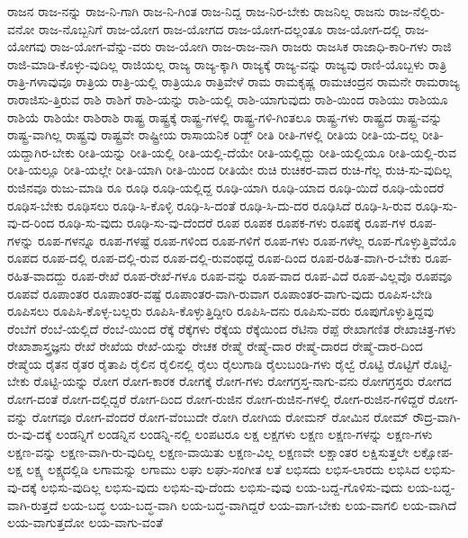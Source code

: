 {ರಾಜನ
ರಾಜ-ನನ್ನು
ರಾಜ-ನಿ-ಗಾಗಿ
ರಾಜ-ನಿ-ಗಿಂತ
ರಾಜ-ನಿದ್ದ
ರಾಜ-ನಿರ-ಬೇಕು
ರಾಜನಿಲ್ಲ
ರಾಜನು
ರಾಜ-ನೆಲ್ಲಿರು-ವನೋ
ರಾಜ-ನೊಬ್ಬನಿಗೆ
ರಾಜ-ಯೋಗ
ರಾಜ-ಯೋಗದ
ರಾಜ-ಯೋಗ-ದಲ್ಲಂತೂ
ರಾಜ-ಯೋಗ-ದಲ್ಲಿ
ರಾಜ-ಯೋಗವು
ರಾಜ-ಯೋಗ-ವೆನ್ನು-ವರು
ರಾಜ-ಯೋಗಿ
ರಾಜ-ರಾಜ-ನಾಗಿ
ರಾಜರು
ರಾಜಸಿಕ
ರಾಜಾಧಿ-ಕಾರಿ-ಗಳು
ರಾಜಿ
ರಾಜಿ-ಮಾಡಿ-ಕೊಳ್ಳು-ವುದಿಲ್ಲ
ರಾಜಿಯಲ್ಲ
ರಾಜ್ಯ
ರಾಜ್ಯ-ಕ್ಕಾಗಿ
ರಾಜ್ಯಕ್ಕೆ
ರಾಜ್ಯ-ವನ್ನು
ರಾಜ್ಯವು
ರಾಣಿ-ಯೊಬ್ಬಳು
ರಾತ್ರಿ
ರಾತ್ರಿ-ಗಳಾವುವೂ
ರಾತ್ರಿಯ
ರಾತ್ರಿ-ಯಲ್ಲಿ
ರಾತ್ರಿಯೂ
ರಾತ್ರಿವೇಳೆ
ರಾಮ
ರಾಮಕೃಷ್ಣ
ರಾಮಚಂದ್ರನ
ರಾಮನೇ
ರಾಮರಾಜ್ಯ
ರಾರಾಜಿಸು-ತ್ತಿರುವ
ರಾಶಿ
ರಾಶಿಗೆ
ರಾಶಿ-ಯನ್ನು
ರಾಶಿ-ಯಲ್ಲಿ
ರಾಶಿ-ಯಾಗುವುದು
ರಾಶಿ-ಯಿಂದ
ರಾಶಿಯು
ರಾಶಿಯೂ
ರಾಶಿಯೆ
ರಾಶಿಯೇ
ರಾಶಿರಾಶಿ
ರಾಷ್ಟ್ರ
ರಾಷ್ಟ್ರಕ್ಕೆ
ರಾಷ್ಟ್ರ-ಗಳಲ್ಲಿ
ರಾಷ್ಟ್ರ-ಗಳಿ-ಗಿಂತಲೂ
ರಾಷ್ಟ್ರ-ಗಳು
ರಾಷ್ಟ್ರದ
ರಾಷ್ಟ್ರ-ವನ್ನು
ರಾಷ್ಟ್ರ-ವಾಗಿಲ್ಲ
ರಾಷ್ಟ್ರವು
ರಾಷ್ಟ್ರವೇ
ರಾಷ್ಟ್ರೀಯ
ರಾಸಾಯನಿಕ
ರಿಡ್ಜ್
ರೀತಿ
ರೀತಿ-ಗಳಲ್ಲಿ
ರೀತಿಯ
ರೀತಿ-ಯ-ದಲ್ಲ
ರೀತಿ-ಯದ್ದಾಗಿರ-ಬೇಕು
ರೀತಿ-ಯನ್ನು
ರೀತಿ-ಯಲ್ಲಿ
ರೀತಿ-ಯಲ್ಲಿ-ದೆಯೇ
ರೀತಿ-ಯಲ್ಲಿದ್ದು
ರೀತಿ-ಯಲ್ಲಿಯೂ
ರೀತಿ-ಯಲ್ಲಿ-ರುವ
ರೀತಿ-ಯಲ್ಲೂ
ರೀತಿ-ಯಲ್ಲೇ
ರೀತಿ-ಯಾಗಿ
ರೀತಿ-ಯಿಂದ
ರೀತಿಯೇ
ರುಚಿ
ರುಚಿಕರ-ವಾದ
ರುಚಿ-ಗೆಲ್ಲ
ರುಚಿ-ಸು-ವುದಿಲ್ಲ
ರುಜಿನವೂ
ರುಜು-ಮಾಡಿ
ರೂ
ರೂಢಿ
ರೂಢಿ-ಯಲ್ಲಿದ್ದ
ರೂಢಿ-ಯಾಗಿ
ರೂಢಿ-ಯಾದ
ರೂಢಿ-ಯಿದೆ
ರೂಢಿ-ಯೆಂದರೆ
ರೂಢಿಸ-ಬೇಕು
ರೂಢಿಸಲು
ರೂಢಿ-ಸಿ-ಕೊಳ್ಳಿ
ರೂಢಿ-ಸಿ-ದಂತೆ
ರೂಢಿ-ಸಿ-ದು-ದರ
ರೂಢಿಸಿದೆ
ರೂಢಿ-ಸಿ-ರುವ
ರೂಢಿ-ಸು-ವು-ದ-ರಿಂದ
ರೂಢಿ-ಸು-ವುದು
ರೂಢಿ-ಸು-ವು-ದೆಂದರೆ
ರೂಪ
ರೂಪಕ
ರೂಪಕ-ಗಳು
ರೂಪಕ್ಕೆ
ರೂಪ-ಗಳ
ರೂಪ-ಗಳನ್ನು
ರೂಪ-ಗಳನ್ನೂ
ರೂಪ-ಗಳಷ್ಟೆ
ರೂಪ-ಗಳಿಂದ
ರೂಪ-ಗಳಿಗೆ
ರೂಪ-ಗಳು
ರೂಪ-ಗಳೆಲ್ಲ
ರೂಪ-ಗೊಳ್ಳುತ್ತಿವೆಯೊ
ರೂಪದ
ರೂಪ-ದಲ್ಲಿ
ರೂಪ-ದಲ್ಲಿ-ರುವ
ರೂಪ-ದಲ್ಲಿ-ರುವಂಥದ್ದೆ
ರೂಪ-ದಿಂದ
ರೂಪ-ರಹಿತ-ವಾಗಿ-ರ-ಬೇಕು
ರೂಪ-ರಹಿತ-ವಾದದ್ದು
ರೂಪ-ರೇಖೆ
ರೂಪ-ರೇಖೆ-ಗಳೂ
ರೂಪ-ವನ್ನು
ರೂಪ-ವಾದ
ರೂಪ-ವಿದೆ
ರೂಪ-ವಿಲ್ಲವೊ
ರೂಪವೂ
ರೂಪವೆ
ರೂಪಾಂತರ
ರೂಪಾಂತರ-ವಷ್ಟೆ
ರೂಪಾಂತರ-ವಾಗಿ-ರುವಾಗ
ರೂಪಾಂತರ-ವಾಗು-ವುದು
ರೂಪಿಸ-ಬೇಡಿ
ರೂಪಿಸಲು
ರೂಪಿಸಿ-ಕೊಳ್ಳ-ಬಲ್ಲರು
ರೂಪಿಸಿ-ಕೊಳ್ಳುತ್ತಿದ್ದೀರಿ
ರೂಪಿಸಿ-ದನು
ರೂಪಿಸು-ವರು
ರೂಪುಗೊಳ್ಳುತ್ತಿದ್ದವು
ರೆಂಬೆಗೆ
ರೆಂಬೆ-ಯಲ್ಲಿದೆ
ರೆಂಬೆ-ಯಿಂದ
ರೆಕ್ಕೆ
ರೆಕ್ಕೆಗಳು
ರೆಕ್ಕೆಯ
ರೆಕ್ಕೆಯಿಂದ
ರೆಟಿನಾ
ರೆಪ್ಪೆ
ರೇಖಾಗಣಿತ
ರೇಖಾಚಿತ್ರ-ಗಳು
ರೇಖಾಶಾಸ್ತ್ರಜ್ಞನು
ರೇಖೆ
ರೇಖೆಯ
ರೇಖೆ-ಯನ್ನು
ರೇಚಕ
ರೇಷ್ಮೆ
ರೇಷ್ಮೆ-ದಾರ
ರೇಷ್ಮೆ-ದಾರದ
ರೇಷ್ಮೆ-ದಾರ-ದಿಂದ
ರೇಷ್ಮೆಯ
ರೈತನ
ರೈತರ
ರೈತಾಪಿ
ರೈಲಿನ
ರೈಲಿನಲ್ಲಿ
ರೈಲು
ರೈಲುಗಾಡಿ
ರೈಲುಬಂಡಿ-ಗಳು
ರೈಲ್ವೆ
ರೊಟ್ಟಿ
ರೊಟ್ಟಿಗೆ
ರೊಟ್ಟಿ-ಬೇಕು
ರೊಟ್ಟಿ-ಯನ್ನು
ರೋಗ
ರೋಗ-ಕಾರಕ
ರೋಗಕ್ಕೆ
ರೋಗ-ಗಳು
ರೋಗಗ್ರಸ್ತ-ನಾಗು-ವನು
ರೋಗಗ್ರಸ್ತರು
ರೋಗದ
ರೋಗ-ದಂತೆ
ರೋಗ-ದಲ್ಲಿದ್ದರೆ
ರೋಗ-ದಿಂದ
ರೋಗ-ರುಜಿನ
ರೋಗ-ರುಜಿನ-ಗಳಲ್ಲಿ
ರೋಗ-ರುಜಿನ-ಗಳಿದ್ದರೆ
ರೋಗ-ವನ್ನು
ರೋಗವೂ
ರೋಗ-ವೆಂದರೆ
ರೋಗ-ವೆಂಬುದೇ
ರೋಗಿ
ರೋಗಿಯ
ರೋಮನ್
ರೋಮಿನ
ರೋಮ್
ರೌದ್ರ-ವಾಗಿ-ರು-ವು-ದಕ್ಕೆ
ಲಂಡನ್ನಿಗೆ
ಲಂಡನ್ನಿನ
ಲಂಡನ್ನಿ-ನಲ್ಲಿ
ಲಂಪಟರೂ
ಲಕ್ಷ
ಲಕ್ಷಗಳು
ಲಕ್ಷಣ
ಲಕ್ಷಣ-ಗಳನ್ನು
ಲಕ್ಷಣ-ಗಳು
ಲಕ್ಷಣ-ವನ್ನು
ಲಕ್ಷಣ-ವಾಗಿ-ರು-ವುದಿಲ್ಲ
ಲಕ್ಷಣ-ವಾಯಿತು
ಲಕ್ಷಣ-ವಿಲ್ಲ
ಲಕ್ಷಣವೇ
ಲಕ್ಷಾಂತರ
ಲಕ್ಷಿಸುತ್ತಲೇ
ಲಕ್ಷೋಪ-ಲಕ್ಷ
ಲಕ್ಷ್ಯ
ಲಕ್ಷ್ಯದಲ್ಲಿಡಿ
ಲಗಾಮನ್ನು
ಲಗಾಮು
ಲಘು
ಲಘು-ಸಂಗೀತ
ಲತೆ
ಲಭಿಸದು
ಲಭಿಸ-ಲಾರದು
ಲಭಿಸಿದ
ಲಭಿಸು-ವು-ದಕ್ಕೆ
ಲಭಿಸು-ವುದಿಲ್ಲ
ಲಭಿಸು-ವುದು
ಲಭಿಸು-ವು-ದೆಂದು
ಲಭಿಸು-ವುವು
ಲಯ-ಬದ್ದ-ಗೊಳಿಸು-ವುದು
ಲಯ-ಬದ್ದ-ವಾಗಿ-ರುತ್ತದೆ
ಲಯ-ಬದ್ಧ
ಲಯ-ಬದ್ಧ-ವಾಗಿ
ಲಯ-ಬದ್ಧ-ವಾಗಿದ್ದರೆ
ಲಯ-ವಾಗ-ಬೇಕು
ಲಯ-ವಾಗಲಿ
ಲಯ-ವಾಗಿದೆ
ಲಯ-ವಾಗುತ್ತದೋ
ಲಯ-ವಾಗು-ವಂತೆ
}
